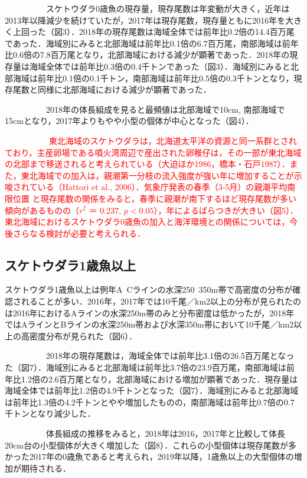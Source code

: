\documentclass[11pt]{article} %
\begin{document}
\begin{linenumbers}
\ \ \ \ \ \ \ \ \ \ 
スケトウダラ0歳魚の現存量，現存尾数は年変動が大きく，近年は2013年以降減少を続けていたが，2017年は現存尾数，現存量ともに2016年を大きく上回った（図3）．2018年の現存尾数は海域全体では前年比0.2倍の14.4百万尾であった．海域別にみると北部海域は前年比0.1倍の6.7百万尾，南部海域は前年比0.6倍の7.8百万尾となり，北部海域における減少が顕著であった．2018年の現存量は海域全体では前年比0.3倍の0.4千トンであった（図3）．海域別にみると北部海域は前年比0.1倍の0.1千トン，南部海域は前年比0.5倍の0.3千トンとなり，現存尾数と同様に北部海域における減少が顕著であった．

\ \ \ \ \ \ \ \ \ \ 
2018年の体長組成を見ると最頻値は北部海域で10cm, 南部海域で15cmとなり，2017年よりもやや小型の個体が中心となった（図4）．

\ \ \ \ \ \ \ \ \ \ 
\textcolor{red}{
東北海域のスケトウダラは，北海道太平洋の資源と同一系群とされており，主産卵場である噴火湾周辺で産出された卵稚仔は，その一部が東北海域の北部まで移送されると考えられている（大迫ほか1986，橋本・石戸1987）．また，東北海域での加入は，親潮第一分枝の流入強度が強い年に増加することが示唆されている（Hattori et al., 2006）．気象庁発表の春季（3-5月）の親潮平均南限位置
と現存尾数の関係をみると，春季に親潮が南下するほど現存尾数が多い傾向があるものの（$r^{2}$ ＝ 0.237, $p < 0.05$），年によるばらつきが大きい（図5）．東北海域におけるスケトウダラ0歳魚の加入と海洋環境との関係については，今後さらなる検討が必要と考えられる．
}

\subsection{スケトウダラ1歳魚以上}
スケトウダラ1歳魚以上は例年A~Cラインの水深250~350m帯で高密度の分布が確認されることが多い．2016年，2017年では10千尾／km2以上の分布が見られたのは2016年におけるAラインの水深250m帯のみと分布密度は低かったが，2018年ではAラインとBラインの水深250m帯および水深350m帯において10千尾／km2以上の高密度分布が見られた（図6）．

\ \ \ \ \ \ \ \ \ \ 
2018年の現存尾数は，海域全体では前年比3.1倍の26.5百万尾となった（図7）．海域別にみると北部海域は前年比3.7倍の23.9百万尾，南部海域は前年比1.2倍の2.6百万尾となり，北部海域における増加が顕著であった．現存量は海域全体では前年比1.2倍の4.9千トンとなった（図7）．海域別にみると北部海域は前年比1.3倍の4.2千トンとやや増加したものの，南部海域は前年比0.7倍の0.7千トンとなり減少した．

\ \ \ \ \ \ \ \ \ \ 
体長組成の推移をみると，2018年は2016，2017年と比較して体長20cm台の小型個体が大きく増加した（図8）．これらの小型個体は現存尾数が多かった2017年の0歳魚であると考えられ，2019年以降，1歳魚以上の大型個体の増加が期待される．


\end{linenumbers}
\end{document}

